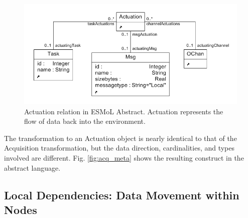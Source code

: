 
\begin{figure}[h]
\centering
\includegraphics[width=0.9\columnwidth]{figures/actuation.png}
    \caption{Actuation relation in ESMoL Abstract. Actuation represents the
flow of data back into the environment.}
    \label{fig:act_meta}
\end{figure}

The transformation to an Actuation object is nearly identical to that of the 
Acquisition transformation, but the data direction, cardinalities, and types 
involved are different.  Fig. \ref{fig:acq_meta} shows the resulting construct in
the abstract language.

\subsection{Local Dependencies: Data Movement within Nodes}

